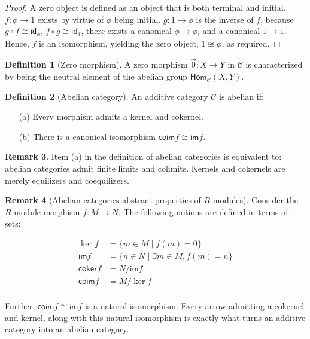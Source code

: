 \documentclass[10pt]{amsart}
\newcommand{\8}{\ensuremath{\infty}}
\newcommand{\0}{\ensuremath{\overset{\rightarrow}{0}}}
\newcommand{\1}{\ensuremath{\mathbf{1}}}
\newcommand{\C}{\ensuremath{\mathscr{C}}}
\newcommand{\id}{\ensuremath{\mathsf{id}}}
\newcommand{\Hom}{\ensuremath{\mathsf{Hom}}}
\newcommand{\coker}{\ensuremath{\mathsf{coker}}}
\newcommand{\im}{\ensuremath{\mathsf{im}}}
\newcommand{\coim}{\ensuremath{\mathsf{coim}}}
\theoremstyle{definition}
\newtheorem{definition}{Definition}[section]
\newtheorem{remark}[definition]{Remark}
\numberwithin{definition}{subsection}
\numberwithin{definition}{section}
\begin{document}
\begin{proof}
  A zero object is defined as an object that is both terminal and initial. $f: \phi \rightarrow 1$ exists by virtue of $\phi$ being initial. $g: 1 \rightarrow \phi$ is the inverse of $f$, because $g \circ f \cong \id_\phi$, $f \circ g \cong \id_1$, there exists a canonical $\phi \rightarrow \phi$, and a canonical $1 \rightarrow 1$. Hence, $f$ is an isomorphism, yielding the zero object, $1 \cong \phi$, as required.
\end{proof}

\begin{definition}[Zero morphism]
  A zero morphism $\0: X \rightarrow Y$ in $\C$ is characterized by being the neutral element of the abelian group $\Hom_\C(X, Y)$.
\end{definition}

\begin{definition}[Abelian category]
  An additive category $\C$ is abelian if:

  \begin{enumerate}
    \item[(a)] Every morphism admits a kernel and cokernel.
    \item[(b)] There is a canonical isomorphism $\coim f \cong \im f$.
  \end{enumerate}
\end{definition}

\begin{remark}
  Item (a) in the definition of abelian categories is equivalent to: abelian categories admit finite limits and colimits. Kernels and cokernels are merely equilizers and coequilizers.
\end{remark}

\begin{remark}[Abelian categories abstract properties of $R$-modules]
  Consider the $R$-module morphism $f : M \rightarrow N$. The following notions are defined in terms of sets:

  \begin{align*}
    \ker f   & = \{m \in M \mid f(m) = 0\}                  \\
    \im f    & = \{n \in N \mid \exists m \in M, f(m) = n\} \\
    \coker f & = N/\im f                                    \\
    \coim f  & = M/\ker f                                   \\
  \end{align*}

  Further, $\coim f \cong \im f$ is a natural isomorphism. Every arrow admitting a cokernel and kernel, along with this natural isomorphism is exactly what turns an additive category into an abelian category.
\end{remark}
\end{document}
